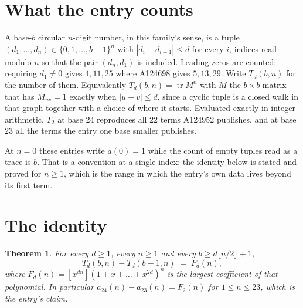 \documentclass[11pt,a4paper]{article}
\theoremstyle{plain}
\newtheorem{theorem}{Theorem}
\theoremstyle{definition}
\begin{document}
\section{What the entry counts}

A base-$b$ circular $n$-digit number, in this family's sense, is a tuple
$(d_1,\dots,d_n)\in\{0,1,\dots,b-1\}^{n}$ with $|d_i-d_{i+1}|\le d$ for every $i$, indices
read modulo $n$ so that the pair $(d_n,d_1)$ is included. Leading zeros are counted: requiring
$d_1\ne0$ gives $4,11,25$ where A124698 gives $5,13,29$. Write $T_d(b,n)$ for the number of
them. Equivalently $T_d(b,n)=\operatorname{tr}M^{n}$ with $M$ the $b\times b$ matrix that has
$M_{uv}=1$ exactly when $|u-v|\le d$, since a cyclic tuple is a closed walk in that graph
together with a choice of where it starts. Evaluated exactly in integer arithmetic, $T_{2}$
at base $24$ reproduces all $22$ terms A124952 publishes, and at base $23$ all the
terms the entry one base smaller publishes.

At $n=0$ these entries write $a(0)=1$ while the count of empty tuples read as a trace is $b$.
That is a convention at a single index; the identity below is stated and proved for $n\ge1$,
which is the range in which the entry's own data lives beyond its first term.

\section{The identity}

\begin{theorem}
For every $d\ge1$, every $n\ge1$ and every $b\ge d\lfloor n/2\rfloor+1$,
\[
T_d(b,n)-T_d(b-1,n)\;=\;F_d(n),
\]
where $F_d(n)=[x^{dn}](1+x+\dots+x^{2d})^{n}$ is the largest coefficient of that
polynomial. In particular $a_{24}(n)-a_{23}(n)=F_{2}(n)$ for $1\le n\le23$, which
is the entry's claim.
\end{theorem}
\end{document}
